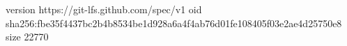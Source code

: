 version https://git-lfs.github.com/spec/v1
oid sha256:fbe35f4437bc2b4b8534be1d928a6a4f4ab76d01fe108405f03e2ae4d25750e8
size 22770
